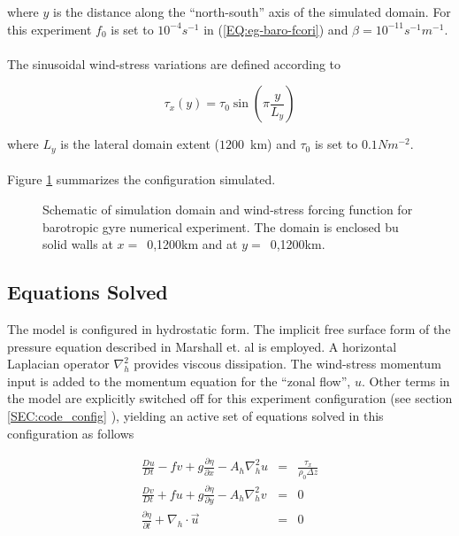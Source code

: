 \noindent where $y$ is the distance along the ``north-south'' axis of the 
simulated domain. For this experiment $f_{0}$ is set to $10^{-4}s^{-1}$ in 
(\ref{EQ:eg-baro-fcori}) and $\beta = 10^{-11}s^{-1}m^{-1}$. 
\\
\\
 The sinusoidal wind-stress variations are defined according to 

\begin{equation}
\label{EQ:eg-baro-taux}
\tau_x(y) = \tau_{0}\sin(\pi \frac{y}{L_y})
\end{equation}
 
\noindent where $L_{y}$ is the lateral domain extent ($1200$~km) and 
$\tau_0$ is set to $0.1N m^{-2}$. 
\\
\\
Figure \ref{FIG:eg-baro-simulation_config}
summarizes the configuration simulated.

\begin{figure}
\centerline{
}
\caption{Schematic of simulation domain and wind-stress forcing function 
for barotropic gyre numerical experiment. The domain is enclosed bu solid
walls at $x=$~0,1200km and at $y=$~0,1200km.}
\label{FIG:eg-baro-simulation_config}
\end{figure}

\subsection{Equations Solved}
\label{www:tutorials}
The model is configured in hydrostatic form. The implicit free surface form of the
pressure equation described in Marshall et. al \cite{marshall:97a} is
employed.
A horizontal Laplacian operator $\nabla_{h}^2$ provides viscous
dissipation. The wind-stress momentum input is added to the momentum equation
for the ``zonal flow'', $u$. Other terms in the model
are explicitly switched off for this experiment configuration (see section
\ref{SEC:code_config} ), yielding an active set of equations solved in this
configuration as follows 

\begin{eqnarray}
\label{EQ:eg-baro-model_equations}
\frac{Du}{Dt} - fv +
              g\frac{\partial \eta}{\partial x} -
              A_{h}\nabla_{h}^2u
& = &
\frac{\tau_{x}}{\rho_{0}\Delta z}
\\
\frac{Dv}{Dt} + fu + g\frac{\partial \eta}{\partial y} -
              A_{h}\nabla_{h}^2v
& = &
0
\\
\frac{\partial \eta}{\partial t} + \nabla_{h}\cdot \vec{u}
&=&
0
\end{eqnarray}

